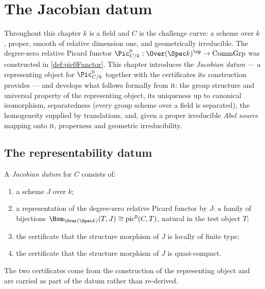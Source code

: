 \chapter{The Jacobian datum}
\label{chap:Jacobian}

Throughout this chapter \(k\) is a field and \(C\) is the challenge curve: a
scheme over \(k\), proper, smooth of relative dimension one, and geometrically
irreducible. The degree-zero relative Picard functor
\(\Pic^0_{C/k} : \Over(\Spec k)^{\op} \to \mathrm{CommGrp}\) was constructed in
\ref{def:pic0Functor}. This chapter introduces the \emph{Jacobian datum} --- a
representing object for \(\Pic^0_{C/k}\) together with the certificates its
construction provides --- and develops what follows formally from it: the
group structure and universal property of the representing object, its
uniqueness up to canonical isomorphism, separatedness (every group scheme over
a field is separated), the homogeneity supplied by translations, and, given a
proper irreducible \emph{Abel source} mapping onto it, properness and geometric
irreducibility.

\section{The representability datum}
\label{sec:jacobian_datum}

\begin{definition}
  \label{def:jacobian_data}
  \leanok
  A \emph{Jacobian datum} for \(C\) consists of:
  \begin{enumerate}
    \item a scheme \(J\) over \(k\);
    \item a representation of the degree-zero relative Picard functor by
      \(J\): a family of bijections
      \(\Hom_{\Over(\Spec k)}(T, J) \cong \mathrm{pic}^0(C, T)\), natural in
      the test object \(T\);
    \item the certificate that the structure morphism of \(J\) is locally of
      finite type;
    \item the certificate that the structure morphism of \(J\) is
      quasi-compact.
  \end{enumerate}
  The two certificates come from the construction of the representing object
  and are carried as part of the datum rather than re-derived.
\end{definition}

